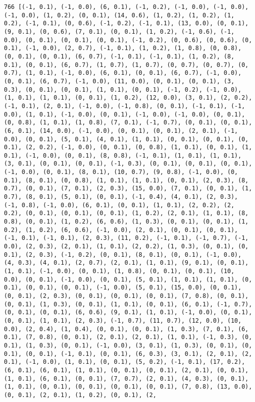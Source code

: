 \documentclass[11pt]{article}
\begin{document}
\begin{Verbatim}[commandchars=\\\{\}]
766 [(-1, 0.1), (-1, 0.0), (6, 0.1), (-1, 0.2), (-1, 0.0), (-1, 0.0), (-1, 0.0), (1, 0.2), (0, 0.1), (14, 0.6), (1, 0.2), (1, 0.2), (1, 0.2), (-1, 0.1), (0, 0.6), (-1, 0.2), (-1, 0.1), (13, 0.0), (0, 0.1), (9, 0.1), (0, 0.6), (7, 0.1), (0, 0.1), (1, 0.2), (-1, 0.6), (-1, 0.0), (0, 0.1), (0, 0.1), (0, 0.1), (-1, 0.2), (0, 0.6), (0, 0.6), (0, 0.1), (-1, 0.0), (2, 0.7), (-1, 0.1), (1, 0.2), (1, 0.8), (0, 0.8), (0, 0.1), (0, 0.1), (6, 0.7), (-1, 0.1), (-1, 0.1), (1, 0.2), (8, 0.1), (0, 0.1), (6, 0.7), (1, 0.7), (1, 0.7), (0, 0.7), (0, 0.7), (0, 0.7), (1, 0.1), (-1, 0.0), (6, 0.1), (0, 0.1), (6, 0.7), (-1, 0.0), (0, 0.1), (6, 0.7), (-1, 0.0), (11, 0.0), (0, 0.1), (0, 0.1), (3, 0.3), (0, 0.1), (0, 0.1), (1, 0.1), (0, 0.1), (-1, 0.2), (-1, 0.0), (1, 0.1), (1, 0.1), (0, 0.1), (1, 0.2), (12, 0.0), (3, 0.1), (2, 0.2), (-1, 0.1), (2, 0.1), (-1, 0.0), (-1, 0.8), (0, 0.1), (-1, 0.1), (-1, 0.0), (1, 0.1), (-1, 0.0), (0, 0.1), (-1, 0.0), (-1, 0.0), (0, 0.1), (0, 0.8), (1, 0.1), (1, 0.8), (7, 0.1), (-1, 0.7), (0, 0.1), (0, 0.1), (6, 0.1), (14, 0.0), (-1, 0.0), (0, 0.1), (0, 0.1), (2, 0.1), (-1, 0.0), (0, 0.1), (5, 0.1), (4, 0.1), (1, 0.1), (0, 0.1), (0, 0.1), (0, 0.1), (2, 0.2), (-1, 0.0), (0, 0.1), (0, 0.8), (1, 0.1), (0, 0.1), (1, 0.1), (-1, 0.0), (0, 0.1), (8, 0.8), (-1, 0.1), (1, 0.1), (1, 0.1), (3, 0.1), (0, 0.1), (0, 0.1), (-1, 0.3), (0, 0.1), (0, 0.1), (0, 0.1), (-1, 0.0), (0, 0.1), (8, 0.1), (10, 0.7), (9, 0.8), (-1, 0.0), (0, 0.1), (8, 0.1), (0, 0.8), (1, 0.1), (1, 0.1), (0, 0.1), (2, 0.3), (8, 0.7), (0, 0.1), (7, 0.1), (2, 0.3), (15, 0.0), (7, 0.1), (0, 0.1), (1, 0.7), (8, 0.1), (5, 0.1), (0, 0.1), (-1, 0.4), (4, 0.1), (2, 0.3), (-1, 0.8), (-1, 0.0), (6, 0.1), (0, 0.1), (1, 0.1), (2, 0.2), (2, 0.2), (0, 0.1), (0, 0.1), (0, 0.1), (1, 0.2), (2, 0.1), (1, 0.1), (8, 0.8), (0, 0.1), (1, 0.2), (6, 0.6), (1, 0.3), (0, 0.1), (0, 0.1), (1, 0.2), (1, 0.2), (6, 0.6), (-1, 0.0), (2, 0.1), (0, 0.1), (0, 0.1), (-1, 0.1), (-1, 0.1), (2, 0.3), (11, 0.2), (-1, 0.1), (-1, 0.7), (-1, 0.0), (2, 0.3), (2, 0.1), (1, 0.1), (2, 0.2), (1, 0.3), (0, 0.1), (0, 0.1), (2, 0.3), (-1, 0.2), (0, 0.1), (8, 0.1), (0, 0.1), (-1, 0.0), (4, 0.3), (4, 0.1), (2, 0.7), (2, 0.1), (1, 0.1), (9, 0.1), (0, 0.1), (1, 0.1), (-1, 0.0), (0, 0.1), (1, 0.8), (0, 0.1), (0, 0.1), (10, 0.0), (0, 0.1), (-1, 0.0), (0, 0.1), (5, 0.1), (1, 0.1), (1, 0.1), (0, 0.1), (0, 0.1), (0, 0.1), (-1, 0.0), (5, 0.1), (15, 0.0), (0, 0.1), (0, 0.1), (2, 0.3), (0, 0.1), (0, 0.1), (0, 0.1), (7, 0.8), (0, 0.1), (0, 0.1), (1, 0.3), (0, 0.1), (1, 0.1), (0, 0.1), (6, 0.1), (-1, 0.7), (0, 0.1), (0, 0.1), (6, 0.6), (9, 0.1), (1, 0.1), (-1, 0.0), (0, 0.1), (0, 0.1), (1, 0.1), (2, 0.3), (-1, 0.7), (11, 0.7), (12, 0.0), (10, 0.0), (2, 0.4), (1, 0.4), (0, 0.1), (0, 0.1), (1, 0.3), (7, 0.1), (6, 0.1), (7, 0.8), (0, 0.1), (2, 0.1), (2, 0.1), (1, 0.1), (-1, 0.3), (0, 0.1), (1, 0.3), (0, 0.1), (-1, 0.0), (3, 0.1), (1, 0.3), (0, 0.1), (0, 0.1), (0, 0.1), (-1, 0.1), (0, 0.1), (6, 0.3), (3, 0.1), (2, 0.1), (2, 0.1), (-1, 0.0), (1, 0.1), (0, 0.1), (5, 0.2), (-1, 0.1), (17, 0.2), (6, 0.1), (6, 0.1), (1, 0.1), (0, 0.1), (0, 0.1), (2, 0.1), (0, 0.1), (1, 0.1), (6, 0.1), (0, 0.1), (7, 0.7), (2, 0.1), (4, 0.3), (0, 0.1), (1, 0.1), (0, 0.1), (0, 0.1), (0, 0.1), (0, 0.1), (7, 0.8), (13, 0.0), (0, 0.1), (2, 0.1), (1, 0.2), (0, 0.1), (2, 
\end{Verbatim}
\end{document}

